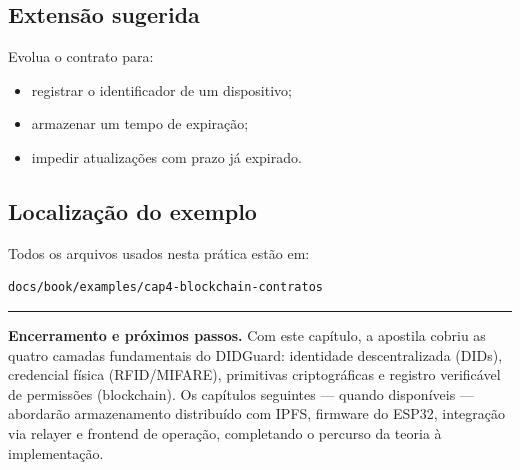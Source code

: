 \subsection{Extensão sugerida}
Evolua o contrato para:
\begin{itemize}[leftmargin=*]
  \item registrar o identificador de um dispositivo;
  \item armazenar um tempo de expiração;
  \item impedir atualizações com prazo já expirado.
\end{itemize}

\subsection{Localização do exemplo}
Todos os arquivos usados nesta prática estão em:
\begin{verbatim}
docs/book/examples/cap4-blockchain-contratos
\end{verbatim}

\vspace{1em}
\noindent\rule{\textwidth}{0.4pt}
\vspace{0.5em}
\noindent\textbf{Encerramento e próximos passos.}
Com este capítulo, a apostila cobriu as quatro camadas fundamentais do DIDGuard: identidade descentralizada (DIDs), credencial física (RFID/MIFARE), primitivas criptográficas e registro verificável de permissões (blockchain). Os capítulos seguintes --- quando disponíveis --- abordarão armazenamento distribuído com IPFS, firmware do ESP32, integração via relayer e frontend de operação, completando o percurso da teoria à implementação.
